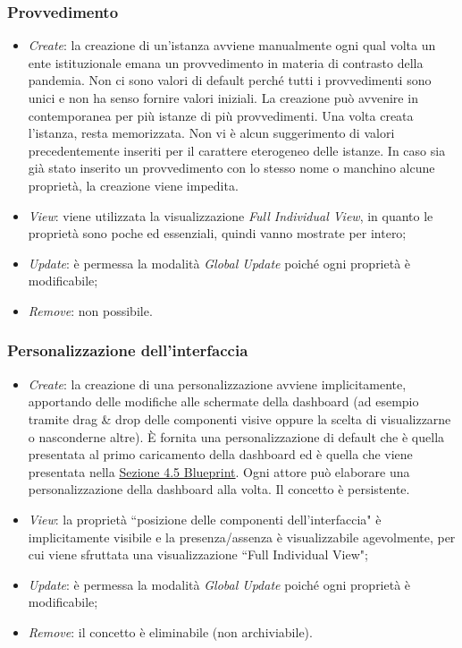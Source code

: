 \subsubsection{Provvedimento}
\label{sss:operazioni-provvedimento}
\begin{itemize}
    \item \textit{Create}: la creazione di un'istanza avviene manualmente ogni qual volta un ente istituzionale emana un provvedimento in materia di contrasto della pandemia.
    Non ci sono valori di default perché tutti i provvedimenti sono unici e non ha senso fornire valori iniziali.
    La creazione può avvenire in contemporanea per più istanze di più provvedimenti.
    Una volta creata l'istanza, resta memorizzata.
    Non vi è alcun suggerimento di valori precedentemente inseriti per il carattere eterogeneo delle istanze.
    In caso sia già stato inserito un provvedimento con lo stesso nome o manchino alcune proprietà, la creazione viene impedita.
    \item \textit{View}: viene utilizzata la visualizzazione \textit{Full Individual View}, in quanto le proprietà sono poche ed essenziali, quindi vanno mostrate per intero;
    \item \textit{Update}: è permessa la modalità \textit{Global Update} poiché ogni proprietà è modificabile;
    \item \textit{Remove}: non possibile.
\end{itemize}

\subsubsection{Personalizzazione dell'interfaccia}
\label{sss:operazioni-personalizzazione-interfaccia}
\begin{itemize}
    \item \textit{Create}: la creazione di una personalizzazione avviene implicitamente, apportando delle modifiche alle schermate della dashboard (ad esempio tramite drag \& drop delle componenti visive oppure la scelta di visualizzarne o nasconderne altre).
    È fornita una personalizzazione di default che è quella presentata al primo caricamento della dashboard ed è quella che viene presentata nella \hyperref[s:struttura-blueprint]{Sezione 4.5 Blueprint}.
    Ogni attore può elaborare una personalizzazione della dashboard alla volta.
    Il concetto è persistente.
    \item \textit{View}: la proprietà ``posizione delle componenti dell'interfaccia" è implicitamente visibile e la presenza/assenza è visualizzabile agevolmente, per cui viene sfruttata una visualizzazione ``Full Individual View";
    \item \textit{Update}: è permessa la modalità \textit{Global Update} poiché ogni proprietà è modificabile;
    \item \textit{Remove}: il concetto è eliminabile (non archiviabile).
\end{itemize}